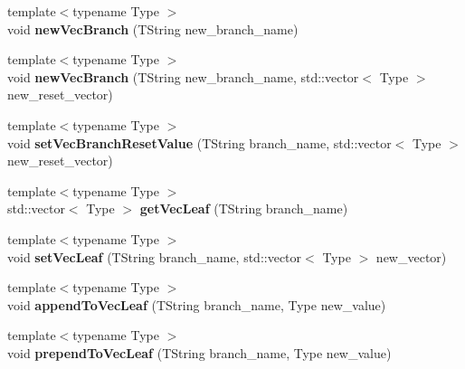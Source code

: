 \begin{DoxyCompactItemize}
\item 
{\footnotesize template$<$typename Type $>$ }\\void {\bfseries new\+Vec\+Branch} (T\+String new\+\_\+branch\+\_\+name)\hypertarget{classArbol_a57b6cf7cca6cbb3b75bb0e0333dbe3c8}{}\label{classArbol_a57b6cf7cca6cbb3b75bb0e0333dbe3c8}

\item 
{\footnotesize template$<$typename Type $>$ }\\void {\bfseries new\+Vec\+Branch} (T\+String new\+\_\+branch\+\_\+name, std\+::vector$<$ Type $>$ new\+\_\+reset\+\_\+vector)\hypertarget{classArbol_aee48fcb853b21527bb67d733a7c5b1b3}{}\label{classArbol_aee48fcb853b21527bb67d733a7c5b1b3}

\item 
{\footnotesize template$<$typename Type $>$ }\\void {\bfseries set\+Vec\+Branch\+Reset\+Value} (T\+String branch\+\_\+name, std\+::vector$<$ Type $>$ new\+\_\+reset\+\_\+vector)\hypertarget{classArbol_a448653919588717f4dfbe910565a3563}{}\label{classArbol_a448653919588717f4dfbe910565a3563}

\item 
{\footnotesize template$<$typename Type $>$ }\\std\+::vector$<$ Type $>$ {\bfseries get\+Vec\+Leaf} (T\+String branch\+\_\+name)\hypertarget{classArbol_a634be85d92f5f26403407952b10a29fd}{}\label{classArbol_a634be85d92f5f26403407952b10a29fd}

\item 
{\footnotesize template$<$typename Type $>$ }\\void {\bfseries set\+Vec\+Leaf} (T\+String branch\+\_\+name, std\+::vector$<$ Type $>$ new\+\_\+vector)\hypertarget{classArbol_aa8547878e687941e4e84fc0e56f814d8}{}\label{classArbol_aa8547878e687941e4e84fc0e56f814d8}

\item 
{\footnotesize template$<$typename Type $>$ }\\void {\bfseries append\+To\+Vec\+Leaf} (T\+String branch\+\_\+name, Type new\+\_\+value)\hypertarget{classArbol_a811156c9134ca7e0015bbe2ab95434b0}{}\label{classArbol_a811156c9134ca7e0015bbe2ab95434b0}

\item 
{\footnotesize template$<$typename Type $>$ }\\void {\bfseries prepend\+To\+Vec\+Leaf} (T\+String branch\+\_\+name, Type new\+\_\+value)\hypertarget{classArbol_a4ac9a92f2ac2e82500e342262bee0418}{}\label{classArbol_a4ac9a92f2ac2e82500e342262bee0418}


\end{DoxyCompactItemize}
